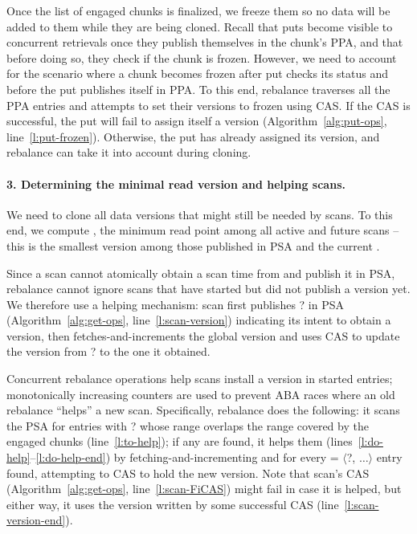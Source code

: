 Once the list of engaged chunks is finalized, we freeze them so no data will be added to them
while they are being cloned. Recall that puts become visible to concurrent retrievals once they
publish themselves in the chunk's PPA, and that before doing so, they check if the chunk
is frozen. However, we need to account for the scenario where a chunk becomes frozen after
put checks its status and before the put publishes itself in PPA.
To this end,
rebalance traverses all the PPA entries and attempts to set their versions to frozen using CAS.
If the CAS is successful, the put will fail to assign itself a version
(Algorithm~\ref{alg:put-ops}, line~\ref{l:put-frozen}). Otherwise, the put has already assigned its version, and
rebalance can take it into account during cloning.

\paragraph{3. Determining the minimal read version and helping scans.}

We need to clone all data versions that might still be needed by scans.
To this end, we compute , the minimum read point among all active  and future scans --
this is the smallest version among those published in PSA and the current .

Since a scan cannot atomically obtain a scan time from  and publish it in PSA,
rebalance cannot ignore scans that have started but did not publish a version yet.
We therefore use a helping mechanism: scan first publishes ? in PSA (Algorithm~\ref{alg:get-ops}, line~\ref{l:scan-version})
indicating its intent to obtain a version, then fetches-and-increments the global version
and uses CAS to update the version from ? to the one it obtained.

Concurrent rebalance operations help scans install a version in started entries;
monotonically increasing counters are used to prevent ABA races where an old rebalance ``helps'' a new scan.
Specifically, rebalance does the following:  it scans the  PSA for entries with ? whose range overlaps the
range covered by the engaged chunks (line~\ref{l:to-help}); if any are found, it helps them (lines~\ref{l:do-help}--\ref{l:do-help-end})
by fetching-and-incrementing  and for every =  $\langle$?, $\dots \rangle$ entry found, 
 attempting to CAS  to  hold the new version.
Note that scan's CAS (Algorithm~\ref{alg:get-ops}, line~\ref{l:scan-FiCAS})  might fail  in case it is helped, but
either way, it uses the version written by some successful CAS (line~\ref{l:scan-version-end}).



